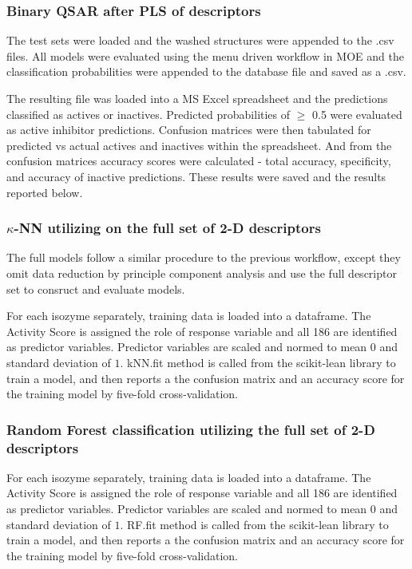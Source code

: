 \subsubsection{Binary QSAR after PLS of descriptors}
The test sets were loaded and the washed structures were appended to the .csv files. All models were evaluated using the menu driven workflow in MOE and the classification probabilities were appended to the database file and saved as a .csv.  

The resulting file was loaded into a MS Excel spreadsheet and the predictions classified as actives or inactives. Predicted probabilities of $\geq$ 0.5 were evaluated as active inhibitor predictions. Confusion matrices were then tabulated for predicted vs actual actives and inactives within the spreadsheet. And from the confusion matrices accuracy scores were calculated - total accuracy, specificity, and accuracy of inactive predictions. These results were saved and the results reported below.

\subsubsection{$\kappa$-NN utilizing on the full set of 2-D descriptors}
The full models follow a similar procedure to the previous workflow, except they omit data reduction by principle component analysis and use the full descriptor set to consruct and evaluate models. 

For each isozyme separately, training data is loaded into a dataframe. The Activity Score is assigned the role of response variable and all 186 are identified as predictor variables. Predictor variables are scaled and normed to mean $0$ and standard deviation of $1$. kNN.fit method is called from the scikit-lean library to train a model, and then reports a the confusion matrix and an accuracy score for the training model by five-fold cross-validation.

\subsubsection{Random Forest classification utilizing the full set of 2-D descriptors}
For each isozyme separately, training data is loaded into a dataframe. The Activity Score is assigned the role of response variable and all 186 are identified as predictor variables. Predictor variables are scaled and normed to mean $0$ and standard deviation of $1$. RF.fit method is called from the scikit-lean library to train a model, and then reports a the confusion matrix and an accuracy score for the training model by five-fold cross-validation.

